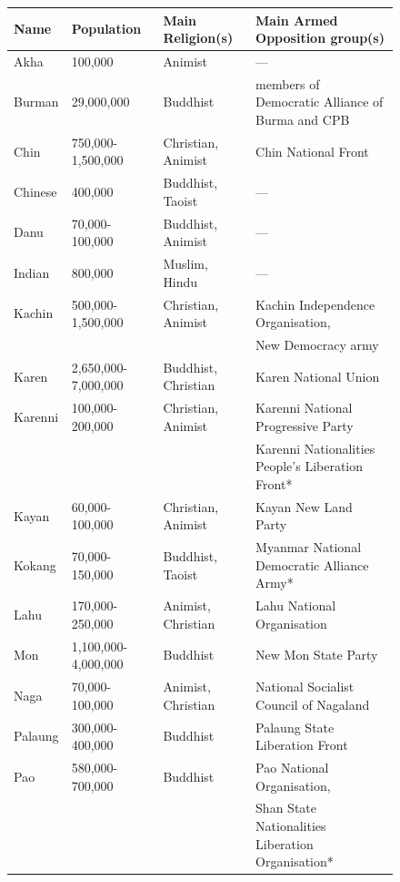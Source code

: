 \documentclass{article}
\begin{document}
\begin{figure}[H]
{{\begin{table}[H]
\centering

\begin{tabular}{@{}lllp{5.5cm}@{}}

\toprule
Name    & Population          & Main Religion(s)   & Main Armed Opposition group(s) \\
\midrule
Akha    & 100,000             & Animist            & --- \\
Burman  & 29,000,000          & Buddhist           & members of Democratic Alliance of Burma and CPB \\
Chin    & 750,000-1,500,000   & Christian, Animist & Chin National Front \\
Chinese & 400,000             & Buddhist, Taoist   & --- \\
Danu    & 70,000-100,000      & Buddhist, Animist  & --- \\
Indian  & 800,000             & Muslim, Hindu      & --- \\
Kachin  & 500,000-1,500,000   & Christian, Animist & Kachin Independence Organisation, \\
        &                     &                    & New Democracy army \\
Karen   & 2,650,000-7,000,000 & Buddhist, Christian & Karen National Union \\
Karenni & 100,000-200,000     & Christian, Animist & Karenni National Progressive Party \\
        &                     &                    & Karenni Nationalities People's Liberation Front* \\
Kayan   & 60,000-100,000      & Christian, Animist & Kayan New Land Party \\
Kokang  & 70,000-150,000      & Buddhist, Taoist   & Myanmar National Democratic Alliance Army* \\
Lahu    & 170,000-250,000     & Animist, Christian & Lahu National Organisation \\
Mon     & 1,100,000-4,000,000 & Buddhist           & New Mon State Party \\
Naga    & 70,000-100,000      & Animist, Christian & National Socialist Council of Nagaland \\
Palaung & 300,000-400,000     & Buddhist           & Palaung State Liberation Front \\
Pao     & 580,000-700,000     & Buddhist           & Pao National Organisation, \\
        &                     &                    & Shan State Nationalities Liberation Organisation* \\

\end{tabular}
\end{table}}}
\end{figure}
\end{document}
